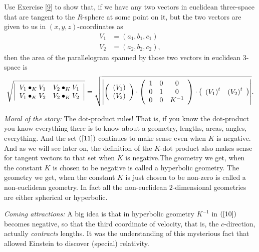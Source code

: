 \documentclass{ximera}
\begin{document}
\begin{exercise}
\label{222}Use Exercise \ref{9} to show that, if we have any two vectors in
euclidean three-space that are tangent to the $R$-sphere at some point on it,
but the two vectors are given to us in $\left(  x,y,z\right)  $-coordinates as%
\begin{align*}
V_{1}  &  =\left(  a_{1},b_{1},c_{1}\right) \\
V_{2}  &  =\left(  a_{2},b_{2},c_{2}\right)  ,
\end{align*}
then the area of the parallelogram spanned by those two vectors in euclidean
$3$-space is%
\[
\sqrt{\left\vert
\begin{array}
[c]{cc}%
V_{1}\bullet_{K}V_{1} & V_{2}\bullet_{K}V_{1}\\
V_{1}\bullet_{K}V_{2} & V_{2}\bullet_{K}V_{2}%
\end{array}
\right\vert }=\sqrt{\left\vert \left(
\begin{array}
[c]{c}%
\left(  V_{1}\right) \\
\left(  V_{2}\right)
\end{array}
\right)  \cdot\left(
\begin{array}
[c]{ccc}%
1 & 0 & 0\\
0 & 1 & 0\\
0 & 0 & K^{-1}%
\end{array}
\right)  \cdot\left(
\begin{array}
[c]{cc}%
\left(  V_{1}\right)  ^{t} & \left(  V_{2}\right)  ^{t}%
\end{array}
\right)  \right\vert }.
\]

\end{exercise}

\textit{Moral of the story:} The dot-product rules! That is, if you know the
dot-product you know everything there is to know about a geometry, lengths,
areas, angles, everything. And the set $\left(  \ref{11}\right)  $ continues
to make sense even when $K$ is negative. And as we will see later on, the
definition of the $K$-dot product also makes sense for tangent vectors to that
set when $K$ is negative.The geometry we get, when the constant $K$ is chosen
to be negative is called a hyperbolic geometry. The geometry we get, when the
constant $K$ is just chosen to be non-zero is called a non-euclidean geometry.
In fact all the non-euclidean $2$-dimensional geometries are either spherical
or hyperbolic.

\textit{Coming attractions:} A big idea is that in hyperbolic geometry
$K^{-1}$ in $\left(  \ref{10}\right)  $ becomes negative, so that the third
coordinate of velocity, that is, the $c$-direction, actually
\textit{contracts} lengths. It was the understanding of this mysterious fact
that allowed Einstein to discover (special) relativity.
\end{document}
